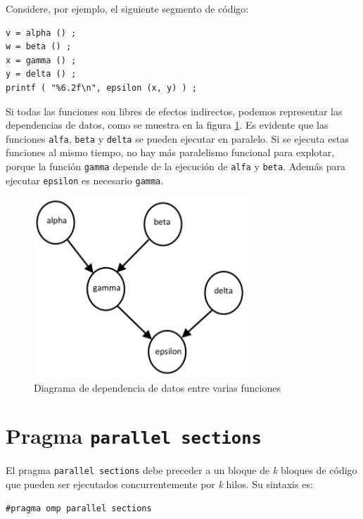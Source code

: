 \documentclass[12pt,letterpaper]{book}
\begin{document}
Considere, por ejemplo, el siguiente segmento de código:

\begin{lstlisting}[style=C]
v = alpha () ;
w = beta () ;
x = gamma () ;
y = delta () ;
printf ( "%6.2f\n", epsilon (x, y) ) ;
\end{lstlisting}

Si todas las funciones son libres de efectos indirectos, podemos representar las dependencias de datos, como se muestra en la figura \ref{fig:func_dependency}. Es evidente que las funciones \texttt{alfa}, \texttt{beta} y \texttt{delta} se pueden ejecutar en paralelo. Si se ejecuta estas funciones al mismo tiempo, no hay más paralelismo funcional para explotar, porque la función \texttt{gamma} depende de la ejecución de \texttt{alfa} y \texttt{beta}. Además para ejecutar \texttt{epsilon} es necesario \texttt{gamma}.

\begin{figure}
\begin{center}
\includegraphics[width=8cm]{../imagenes/func_dependency.png} 
\end{center}
\caption{Diagrama de dependencia de datos entre varias funciones}
\label{fig:func_dependency}
\end{figure}


\section{Pragma \texttt{parallel sections}}
El pragma \texttt{parallel sections} debe preceder a un bloque de \textit{k} bloques de código que pueden ser ejecutados concurrentemente por \textit{k} hilos. Su sintaxis es:

\begin{lstlisting}[style=C]
#pragma omp parallel sections
\end{lstlisting}
\end{document}
